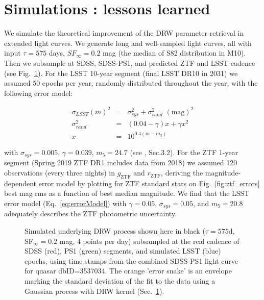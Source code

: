 \documentclass[twocolumn]{aastex62}
\begin{document}

%
%
%
%
%

\section{Simulations : lessons learned}\label{sec:simulation}

We simulate the theoretical improvement of the DRW parameter retrieval in extended light curves. We generate long and well-sampled light curves, all with input $\tau = 575 $ days, $SF_{\infty} = 0.2$ mag (the median of S82 distribution in M10). Then we subsample at SDSS, SDSS-PS1, and predicted ZTF and LSST cadence (see Fig.~\ref{fig:simLC}). For the LSST 10-year segment (final LSST DR10 in 2031) we assumed 50 epochs per year, randomly distributed throughout the year, with the following error model:

\begin{eqnarray}
\label{eq:errorModel}
\sigma_{LSST}(m)^{2} &=& \sigma_{sys}^{2} + \sigma_{rand}^{2} \,\, \mathrm{(mag)}^{2} \\
\sigma_{rand}^{2} &=& (0.04-\gamma)x + \gamma x^{2} \nonumber \\
x &=& 10^{0.4(m-m_{5})} \nonumber
\end{eqnarray}

with  $\sigma_{sys} = 0.005$, $\gamma=0.039$, $m_{5} = 24.7$ (see \citealt{ivezic2019}, Sec.3.2).
For the ZTF 1-year segment (Spring 2019 ZTF DR1 includes data from 2018) we assumed 120 observations (every three nights) in $g_{\mathrm{ZTF}}$ and $r_{\mathrm{ZTF}}$, deriving the magnitude-dependent error model by plotting for ZTF standard stars on Fig.~\ref{fig:ztf_errors} best mag rms as a function of best median magnitude. We find that the LSST error model (Eq.~\ref{eq:errorModel}) with $\gamma = 0.05$, $\sigma_{sys} = 0.05 $, and $m_{5} = 20.8$ adequately describes the ZTF photometric uncertainty. 

\begin{figure}%
\caption{Simulated underlying DRW process shown here in black ($\tau=575$d, SF$_{\infty} = 0.2$ mag, 4 points per day) subsampled at the real cadence of SDSS (red), PS1 (green) segments, and simulated LSST (blue) epochs, using time stamps from the combined SDSS-PS1 light curve for quasar dbID=3537034. The orange 'error snake' is an envelope marking the standard deviation of the fit to the data using a Gaussian process  with DRW kernel (Sec.~\ref{sec:simulation}).}
\label{fig:simLC}
\end{figure} 
\end{document}
